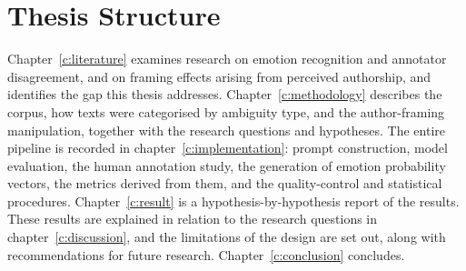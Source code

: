 \section{Thesis Structure}
\label{intro:structure}

\noindent
Chapter~\ref{c:literature} examines research on emotion recognition and annotator disagreement,
and on framing effects arising from perceived authorship, and identifies the gap this thesis
addresses. Chapter~\ref{c:methodology} describes the corpus, how texts were categorised by
ambiguity type, and the author-framing manipulation, together with the research questions and
hypotheses. The entire pipeline is recorded in chapter~\ref{c:implementation}: prompt
construction, model evaluation, the human annotation study, the generation of emotion probability
vectors, the metrics derived from them, and the quality-control and statistical procedures.
Chapter~\ref{c:result} is a hypothesis-by-hypothesis report of the results. These results are
explained in relation to the research questions in chapter~\ref{c:discussion}, and the
limitations of the design are set out, along with recommendations for future research.
Chapter~\ref{c:conclusion} concludes.
